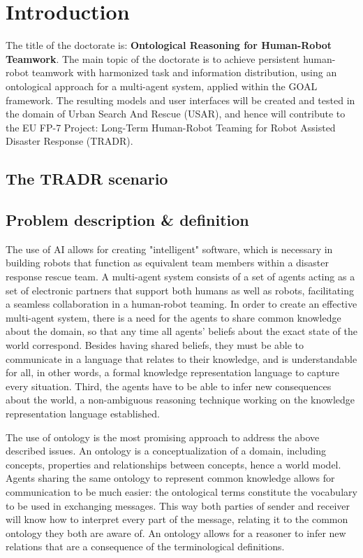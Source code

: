 \chapter{Introduction}
The title of the doctorate is: \textbf{Ontological Reasoning for Human-Robot Teamwork}.
The main topic of the doctorate is to achieve persistent human-robot teamwork with harmonized task and information distribution, using an ontological approach for a multi-agent system, applied within the GOAL framework. The resulting models and user interfaces will be created and tested in the domain of Urban Search And Rescue (USAR), and hence will contribute to the EU FP-7 Project: Long-Term Human-Robot Teaming for Robot Assisted Disaster Response (TRADR).




\section{The TRADR scenario}

\section{Problem description & definition}

The use of AI allows for creating "intelligent" software, which is necessary in building robots that function as equivalent team members within a disaster response rescue team. A multi-agent system consists of a set of agents acting as a set of electronic partners that support both humans as well as robots, facilitating a seamless collaboration in a human-robot teaming. In order to create an effective multi-agent system, there is a need for the agents to share common knowledge about the domain, so that any time all agents' beliefs about the exact state of the world correspond. Besides having shared
beliefs, they must be able to communicate in a language that relates to their knowledge, and is understandable for all, in other words, a formal knowledge representation language to capture every situation. Third, the agents have to be able to infer new consequences about the world, a non-ambiguous reasoning technique working on the knowledge representation language established.

The use of ontology is the most promising approach to address the above described issues. An ontology is a conceptualization of a domain, including concepts, properties and relationships between concepts, hence a world model. Agents sharing the same ontology to represent common knowledge allows for communication to be much easier: the ontological terms constitute
the vocabulary to be used in exchanging messages. This way both parties of sender and receiver will know how to interpret every part of the message, relating it to the common ontology they both are aware of. An ontology
allows for a reasoner to infer new relations that are a consequence of the terminological definitions.

